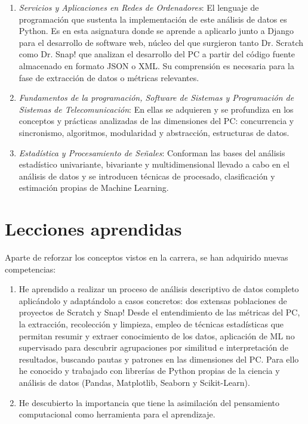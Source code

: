 \documentclass[a4paper, 12pt]{book}
\begin{document}
\begin{enumerate}
    \item \emph{Servicios y Aplicaciones en Redes de Ordenadores}: El lenguaje de programación que sustenta la implementación de este análisis de datos es Python. Es en esta asignatura donde se aprende a aplicarlo junto a Django para el desarrollo de software web, núcleo del que surgieron tanto Dr. Scratch como Dr. Snap! que analizan el desarrollo del PC a partir del código fuente almacenado en formato JSON o XML. Su comprensión es necesaria para la fase de extracción de datos o métricas relevantes.
    \item \emph{Fundamentos de la programación, Software de Sistemas y Programación de Sistemas de Telecomunicación}: En ellas se adquieren y se profundiza en los conceptos y prácticas analizadas de las dimensiones del PC: concurrencia y sincronismo, algoritmos, modularidad y abstracción, estructuras de datos.  
    \item \emph{Estadística y Procesamiento de Señales}: Conforman las bases del análisis estadístico univariante, bivariante y multidimensional llevado a cabo en el análisis de datos y se introducen técnicas de procesado, clasificación y estimación propias de Machine Learning.
\end{enumerate}

\section{Lecciones aprendidas}
\label{sec:lecciones_aprendidas}

Aparte de reforzar los conceptos vistos en la carrera, se han adquirido nuevas competencias:

\begin{enumerate}
    \item He aprendido a realizar un proceso de análisis descriptivo de datos completo aplicándolo y adaptándolo a casos concretos: dos extensas poblaciones de proyectos de Scratch y Snap! Desde el entendimiento de las métricas del PC, la extracción, recolección y limpieza, empleo de técnicas estadísticas que permitan resumir y extraer conocimiento de los datos, aplicación de ML no supervisado para descubrir agrupaciones por similitud e interpretación de resultados, buscando pautas y patrones en las dimensiones del PC. Para ello he conocido y trabajado con librerías de Python propias de la ciencia y análisis de datos (Pandas, Matplotlib, Seaborn y Scikit-Learn).
    \item He descubierto la importancia que tiene la asimilación del pensamiento computacional como herramienta para el aprendizaje.
\end{enumerate}
\end{document}

